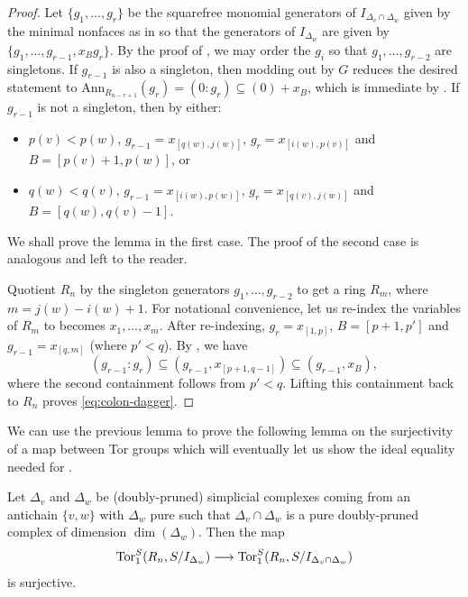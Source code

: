 \begin{proof}
 Let $\{g_1,\dots,g_r\}$ be the squarefree monomial generators of $I_{\Delta_v\cap\Delta_w}$ given by the minimal nonfaces as in  so that the generators of $I_{\Delta_w}$ are given by $\{g_1,\dots, g_{r-1},x_B g_r\}$. By the proof of , we may order the $g_i$ so that $g_1,\dots, g_{r-2}$ are singletons.
 If $g_{r-1}$ is also a singleton, then modding out by $G$ reduces the desired statement to $\mathrm{Ann}_{R_{n-r+1}}(g_r) = (0:g_r) \subseteq (0)+x_B$, which is immediate by .
 If $g_{r-1}$ is not a singleton, then by  either:
\begin{itemize}
    \item $p(v)<p(w)$, $g_{r-1} = x_{[q(w),j(w)]}$, $g_r = x_{[i(w),p(v)]}$ and $B = [p(v)+1,p(w)]$, or
    \item $q(w)<q(v)$, $g_{r-1} = x_{[i(w),p(w)]}$, $g_r = x_{[q(v),j(w)]}$ and $B = [q(w),q(v)-1]$.
\end{itemize}
We shall prove the lemma in the first case. The proof of the second case is analogous and left to the reader. 

Quotient $R_n$ by the singleton generators $g_1,\dots, g_{r-2}$ to get a ring $R_m$, where $m= j(w)-i(w)+1$. For notational convenience, let us re-index the variables of $R_m$ to becomes $x_1,\dots, x_m$. After re-indexing, $g_r=x_{[1,p]}$, $B = [p+1,p']$  and $g_{r-1}=x_{[q, m]}$ (where $p'<q$). By 
, we have
\[(g_{r-1}:g_r)\subseteq(g_{r-1},x_{[p+1,q-1]})\subseteq(g_{r-1},x_B), \]
where the second containment follows from $p'<q$. 
Lifting this containment back to $R_n$ proves \eqref{eq:colon-dagger}.
\end{proof}

We can use the previous lemma to prove the following lemma on the surjectivity of a map between Tor groups which will eventually let us show the ideal equality needed for .

\begin{lemma}
\label{lem:one-sided-koszul-transfer}
Let $\Delta_v$ and $\Delta_w$ be (doubly-pruned) simplicial complexes coming from an antichain $\{v,w\}$ with $\Delta_w$ pure such that $\Delta_v\cap \Delta_w$ is a pure doubly-pruned complex of dimension $\dim(\Delta_w)$. 
Then the map
\[ \operatorname{Tor}_1^S(R_n,S/I_{\Delta_w})\longrightarrow\operatorname{Tor}_1^S(R_n,S/I_{\Delta_v\cap \Delta_w}) \]
is surjective.
\end{lemma}

